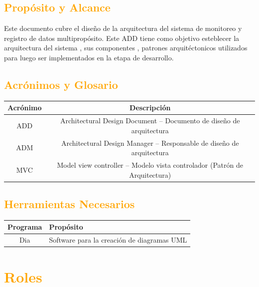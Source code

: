\subsection{\textcolor{orange}{Propósito y Alcance}}
Este documento cubre el diseño de la arquitectura  del sistema
de monitoreo y registro de datos multipropósito. Este ADD tiene como objetivo
esteblecer la arquitectura del sistema , sus componentes , patrones
arquitéctonicos utilizados para luego ser implementados en la etapa de desarrollo.

\subsection{\textcolor{orange}{Acrónimos y Glosario}}
\begin{table}[!h]
\begin{center}
\begin{tabular}{|c|c|}
\hline
\rowcolor[RGB]{255,127,0} Acrónimo & Descripción \\
\hline
ADD & Architectural Design Document – Documento de diseño de arquitectura\\
\hline
ADM & Architectural Design Manager – Responsable de diseño de arquitectura\\
\hline
MVC & Model view controller – Modelo vista controlador (Patrón de
Arquitectura)\\
\hline
\end{tabular}
\end{center}
\end{table}

\subsection{\textcolor{orange}{Herramientas Necesarios}}
\begin{table}[!h]
\begin{center}
\begin{tabular}{|c|p{100mm}|}
\hline
\rowcolor[RGB]{255,127,0} Programa & Propósito \\
\hline
Dia & Software para la creación de diagramas UML \\
\hline
\end{tabular}
\end{center}
\end{table}

\newpage
\section{\textcolor{orange}{Roles}}
